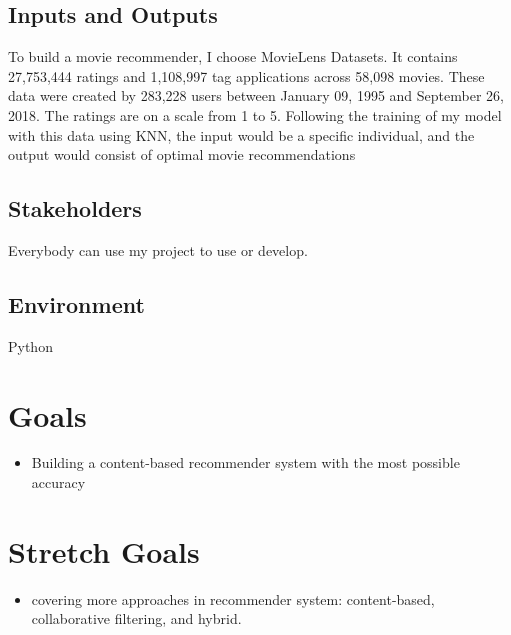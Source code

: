 \documentclass{article}
\begin{document}
\subsection{Inputs and Outputs}

To build a movie recommender, I choose MovieLens Datasets. It contains 27,753,444 ratings and 1,108,997 tag applications across 58,098 movies. These data were created by 283,228 users between January 09, 1995 and September 26, 2018. The ratings are on a scale from 1 to 5.
Following the training of my model with this data using KNN, the input would be a specific individual, and the output would consist of optimal movie recommendations


\subsection{Stakeholders}
Everybody can use my project to use or develop. 

\subsection{Environment}

Python

\section{Goals}

\begin{itemize}
    
    \item Building a content-based recommender system with the most possible accuracy
    
\end{itemize}



\section{Stretch Goals}

    \begin{itemize}
        \item covering more approaches in recommender system: content-based, collaborative filtering, and hybrid.
    \end{itemize}
\end{document}

